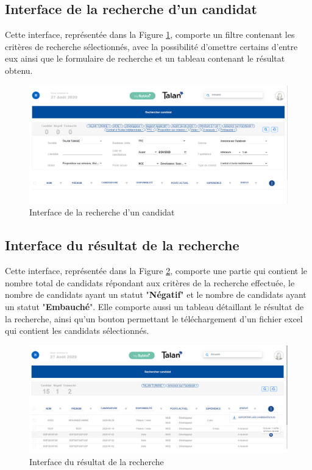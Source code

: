 \subsection{Interface de la recherche d'un candidat}
Cette interface, représentée dans la Figure \ref{fig:capture_recherche}, comporte un filtre contenant les critères de recherche sélectionnés, avec la possibilité d'omettre certains d'entre eux ainsi que le formulaire de recherche et un tableau contenant le résultat obtenu.
\begin{figure}[H]
     \centering
     \includegraphics[scale=0.5]{img/capture recherche candidat.PNG}
     \caption{Interface de la recherche d'un candidat}
     \label{fig:capture_recherche}
 \end{figure}
 \subsection{Interface du résultat de la recherche}
 Cette interface, représentée dans la Figure \ref{fig:capture_resultat_recherche}, comporte une partie qui contient le nombre total de candidats répondant aux critères de la recherche effectuée, le nombre  de candidats ayant un statut "\textbf{Négatif}" et le nombre  de candidats ayant un statut "\textbf{Embauché}". Elle comporte aussi un tableau détaillant le résultat de la recherche, ainsi qu'un bouton permettant le téléchargement d'un fichier excel qui contient les candidats sélectionnés. 
 \begin{figure}[H]
     \centering
     \includegraphics[scale=0.5]{img/capture resultat recherche.png}
     \caption{Interface du résultat de la recherche}
     \label{fig:capture_resultat_recherche}
 \end{figure}
